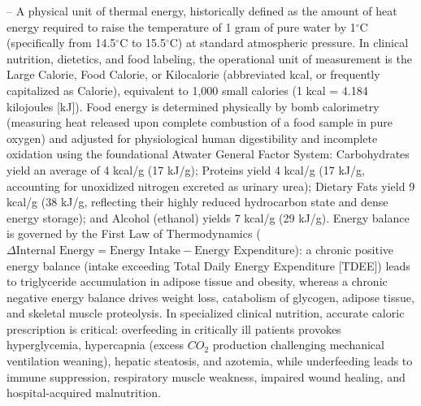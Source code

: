 -- A physical unit of thermal energy, historically defined as the amount of heat energy required to raise the temperature of 1 gram of pure water by 1$^\circ$C (specifically from 14.5$^\circ$C to 15.5$^\circ$C) at standard atmospheric pressure. In clinical nutrition, dietetics, and food labeling, the operational unit of measurement is the Large Calorie, Food Calorie, or Kilocalorie (abbreviated kcal, or frequently capitalized as Calorie), equivalent to 1,000 small calories (1 kcal = 4.184 kilojoules [kJ]). Food energy is determined physically by bomb calorimetry (measuring heat released upon complete combustion of a food sample in pure oxygen) and adjusted for physiological human digestibility and incomplete oxidation using the foundational Atwater General Factor System: Carbohydrates yield an average of 4 kcal/g (17 kJ/g); Proteins yield 4 kcal/g (17 kJ/g, accounting for unoxidized nitrogen excreted as urinary urea); Dietary Fats yield 9 kcal/g (38 kJ/g, reflecting their highly reduced hydrocarbon state and dense energy storage); and Alcohol (ethanol) yields 7 kcal/g (29 kJ/g). Energy balance is governed by the First Law of Thermodynamics ($\Delta\text{Internal Energy} = \text{Energy Intake} - \text{Energy Expenditure}$): a chronic positive energy balance (intake exceeding Total Daily Energy Expenditure [TDEE]) leads to triglyceride accumulation in adipose tissue and obesity, whereas a chronic negative energy balance drives weight loss, catabolism of glycogen, adipose tissue, and skeletal muscle proteolysis. In specialized clinical nutrition, accurate caloric prescription is critical: overfeeding in critically ill patients provokes hyperglycemia, hypercapnia (excess $CO_2$ production challenging mechanical ventilation weaning), hepatic steatosis, and azotemia, while underfeeding leads to immune suppression, respiratory muscle weakness, impaired wound healing, and hospital-acquired malnutrition.

